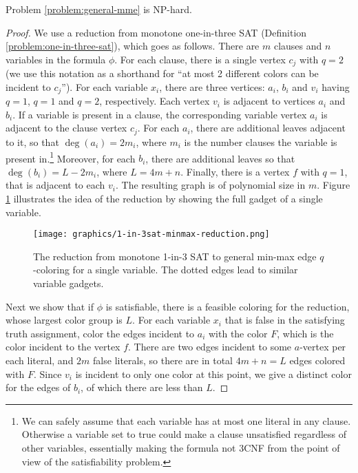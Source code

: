 \documentclass[runningheads, a4paper]{llncs}
\begin{document}
\begin{theorem}\label{theorem:general-mme-np-hard}
Problem \ref{problem:general-mme} is NP-hard.
\end{theorem}
\begin{proof}
We use a reduction from monotone one-in-three SAT (Definition \ref{problem:one-in-three-sat}), which goes as follows. There are $m$ clauses and $n$ variables in the formula $\phi$. For each clause, there is a single vertex $c_j$ with $q=2$ (we use this notation as a shorthand for ``at most 2 different colors can be incident to $c_j$''). For each variable $x_i$, there are three vertices: $a_i$, $b_i$ and $v_i$ having $q=1$, $q=1$ and $q=2$, respectively. Each vertex $v_i$ is adjacent to vertices $a_i$ and $b_i$. If a variable is present in a clause, the corresponding variable vertex $a_i$ is adjacent to the clause vertex $c_j$. For each $a_i$, there are additional leaves adjacent to it, so that $\deg(a_i) = 2m_i$, where $m_i$ is the number clauses the variable is present in.\footnote{We can safely assume that each variable has at most one literal in any clause. Otherwise a variable set to true could make a clause unsatisfied regardless of other variables, essentially making the formula not 3CNF from the point of view of the satisfiability problem.} Moreover, for each $b_i$, there are additional leaves so that $\deg(b_i) = L - 2m_i$, where $L = 4m + n$.  Finally, there is a vertex $f$ with $q=1$, that is adjacent to each $v_i$. The resulting graph is of polynomial size in $m$. Figure \ref{img:1-in-3sat-minmax-reduction} illustrates the idea of the reduction by showing the full gadget of a single variable.

\begin{figure}[htb]
\centering \texttt{[image: graphics/1-in-3sat-minmax-reduction.png]}
\caption{The reduction from monotone 1-in-3 SAT to general min-max edge $q$-coloring for a single variable. The dotted edges lead to similar variable gadgets.}\label{img:1-in-3sat-minmax-reduction}
\end{figure}

Next we show that if $\phi$ is satisfiable, there is a feasible coloring for the reduction, whose largest color group is $L$. For each variable $x_i$ that is false in the satisfying truth assignment, color the edges incident to $a_i$ with the color $F$, which is the color incident to the vertex $f$. There are two edges incident to some $a$-vertex per each literal, and $2m$ false literals, so there are in total $4m + n = L$ edges colored with $F$. Since $v_i$ is incident to only one color at this point, we give a distinct color for the edges of $b_i$, of which there are less than $L$.


\end{proof}
\end{document}
